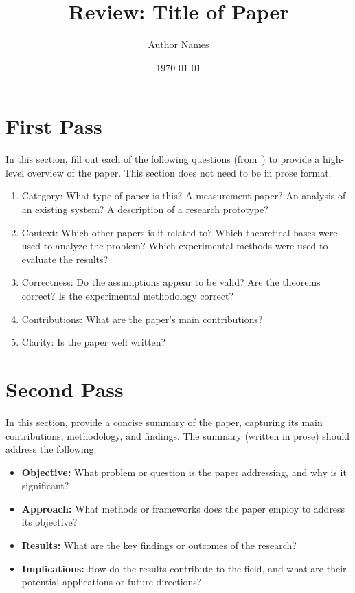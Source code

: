 \documentclass{article}
\title{Review: Title of Paper}
\author[1]{Author Names}
\affil[1]{Loyola Marymount University}
\date{\today}
\begin{document}
\maketitle


\section{First Pass}
In this section, fill out each of the following questions (from~\cite{how_to_read_a_paper}) to provide a high-level overview of the paper.
This section does not need to be in prose format.
\begin{enumerate}
    \item Category: What type of paper is this? A measurement paper? An analysis of an existing system? A description of a research prototype?
    \item Context: Which other papers is it related to? Which theoretical bases were used to analyze the problem? Which experimental methods were used to evaluate the results?
    \item Correctness: Do the assumptions appear to be valid? Are the theorems correct? Is the experimental methodology correct?
    \item Contributions: What are the paper's main contributions?
    \item Clarity: Is the paper well written?
\end{enumerate}

\section{Second Pass}
In this section, provide a concise summary of the paper, capturing its main contributions, methodology, and findings. The summary (written in prose) should address the following:

\begin{itemize}
    \item \textbf{Objective:} What problem or question is the paper addressing, and why is it significant?
    \item \textbf{Approach:} What methods or frameworks does the paper employ to address its objective?
    \item \textbf{Results:} What are the key findings or outcomes of the research?
    \item \textbf{Implications:} How do the results contribute to the field, and what are their potential applications or future directions?
\end{itemize}
\end{document}
